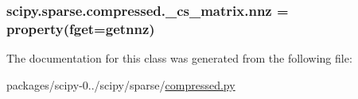 \subsubsection[{nnz}]{\setlength{\rightskip}{0pt plus 5cm}scipy.\+sparse.\+compressed.\+\_\+cs\+\_\+matrix.\+nnz = property(fget={\bf getnnz})\hspace{0.3cm}{\ttfamily [static]}}\label{classscipy_1_1sparse_1_1compressed_1_1__cs__matrix_a1140a7bbe239d44015eaac4c80098332}


The documentation for this class was generated from the following file\+:\begin{DoxyCompactItemize}
\item 
packages/scipy-\/0../scipy/sparse/\hyperlink{compressed_8py}{compressed.\+py}\end{DoxyCompactItemize}
